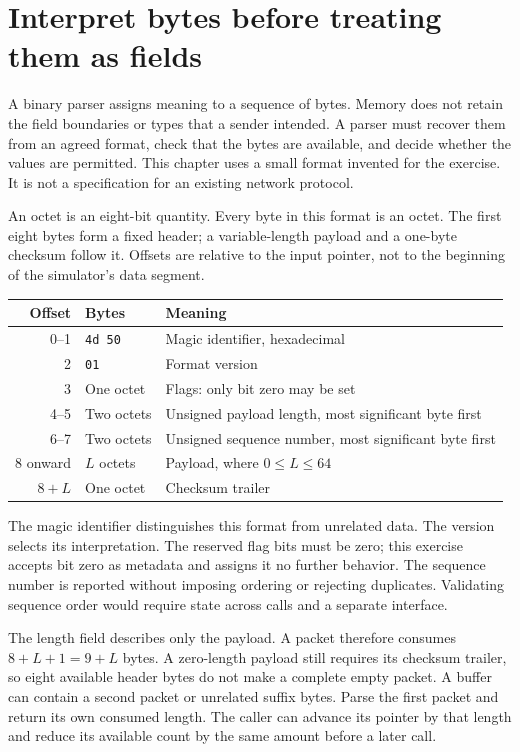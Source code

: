\section{Interpret bytes before treating them as fields}
A binary parser assigns meaning to a sequence of bytes. Memory does not retain the
field boundaries or types that a sender intended. A parser must recover them from
an agreed format, check that the bytes are available, and decide whether the values
are permitted. This chapter uses a small format invented for the exercise. It is
not a specification for an existing network protocol.

An octet is an eight-bit quantity. Every byte in this format is an octet. The
first eight bytes form a fixed header; a variable-length payload and a one-byte
checksum follow it. Offsets are relative to the input pointer, not to the beginning
of the simulator's data segment.

\begin{longtable}{rll}
  \toprule Offset & Bytes          & Meaning                                               \\\midrule
  0--1            & \texttt{4d 50} & Magic identifier, hexadecimal                         \\
  2               & \texttt{01}    & Format version                                        \\
  3               & One octet      & Flags: only bit zero may be set                       \\
  4--5            & Two octets     & Unsigned payload length, most significant byte first  \\
  6--7            & Two octets     & Unsigned sequence number, most significant byte first \\
  8 onward        & \(L\) octets   & Payload, where \(0\leq L\leq64\)                      \\
  \(8+L\)         & One octet      & Checksum trailer                                      \\\bottomrule
\end{longtable}
The magic identifier distinguishes this format from unrelated data. The version
selects its interpretation. The reserved flag bits must be zero; this exercise
accepts bit zero as metadata and assigns it no further behavior. The sequence
number is reported without imposing ordering or rejecting duplicates. Validating
sequence order would require state across calls and a separate interface.

The length field describes only the payload. A packet therefore consumes
\(8+L+1=9+L\) bytes. A zero-length payload still requires its checksum trailer,
so eight available header bytes do not make a complete empty packet. A buffer can
contain a second packet or unrelated suffix bytes. Parse the first packet and
return its own consumed length. The caller can advance its pointer by that length
and reduce its available count by the same amount before a later call.
